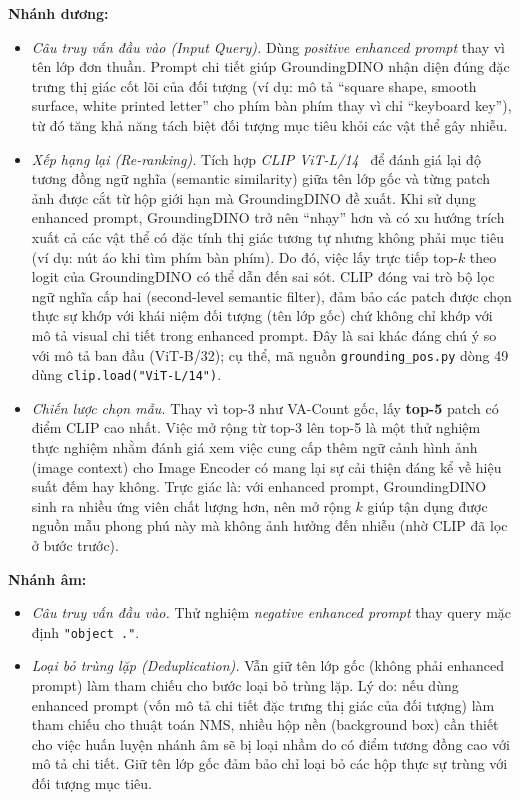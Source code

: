 \documentclass[a4paper,12pt]{report}
\numberwithin{figure}{chapter}
\numberwithin{table}{chapter}
\begin{document}
\textbf{Nhánh dương:}
\begin{itemize}
    \item \textit{Câu truy vấn đầu vào (Input Query).} Dùng \emph{positive enhanced prompt} thay vì tên lớp đơn thuần. Prompt chi tiết giúp GroundingDINO nhận diện đúng đặc trưng thị giác cốt lõi của đối tượng (ví dụ: mô tả ``square shape, smooth surface, white printed letter'' cho phím bàn phím thay vì chỉ ``keyboard key''), từ đó tăng khả năng tách biệt đối tượng mục tiêu khỏi các vật thể gây nhiễu.
    \item \textit{Xếp hạng lại (Re-ranking).} Tích hợp \emph{CLIP ViT-L/14}~\cite{clip} để đánh giá lại độ tương đồng ngữ nghĩa (semantic similarity) giữa tên lớp gốc và từng patch ảnh được cắt từ hộp giới hạn mà GroundingDINO đề xuất. Khi sử dụng enhanced prompt, GroundingDINO trở nên ``nhạy'' hơn và có xu hướng trích xuất cả các vật thể có đặc tính thị giác tương tự nhưng không phải mục tiêu (ví dụ: nút áo khi tìm phím bàn phím). Do đó, việc lấy trực tiếp top-$k$ theo logit của GroundingDINO có thể dẫn đến sai sót. CLIP đóng vai trò bộ lọc ngữ nghĩa cấp hai (second-level semantic filter), đảm bảo các patch được chọn thực sự khớp với khái niệm đối tượng (tên lớp gốc) chứ không chỉ khớp với mô tả visual chi tiết trong enhanced prompt. Đây là sai khác đáng chú ý so với mô tả ban đầu (ViT-B/32); cụ thể, mã nguồn \texttt{grounding\_pos.py} dòng 49 dùng \texttt{clip.load("ViT-L/14")}.
    \item \textit{Chiến lược chọn mẫu.} Thay vì top-3 như VA-Count gốc, lấy \textbf{top-5} patch có điểm CLIP cao nhất. Việc mở rộng từ top-3 lên top-5 là một thử nghiệm thực nghiệm nhằm đánh giá xem việc cung cấp thêm ngữ cảnh hình ảnh (image context) cho Image Encoder có mang lại sự cải thiện đáng kể về hiệu suất đếm hay không. Trực giác là: với enhanced prompt, GroundingDINO sinh ra nhiều ứng viên chất lượng hơn, nên mở rộng $k$ giúp tận dụng được nguồn mẫu phong phú này mà không ảnh hưởng đến nhiễu (nhờ CLIP đã lọc ở bước trước).
\end{itemize}

\textbf{Nhánh âm:}
\begin{itemize}
    \item \textit{Câu truy vấn đầu vào.} Thử nghiệm \emph{negative enhanced prompt} thay query mặc định \texttt{"object ."}.
    \item \textit{Loại bỏ trùng lặp (Deduplication).} Vẫn giữ tên lớp gốc (không phải enhanced prompt) làm tham chiếu cho bước loại bỏ trùng lặp. Lý do: nếu dùng enhanced prompt (vốn mô tả chi tiết đặc trưng thị giác của đối tượng) làm tham chiếu cho thuật toán NMS, nhiều hộp nền (background box) cần thiết cho việc huấn luyện nhánh âm sẽ bị loại nhầm do có điểm tương đồng cao với mô tả chi tiết. Giữ tên lớp gốc đảm bảo chỉ loại bỏ các hộp thực sự trùng với đối tượng mục tiêu.
\end{itemize}
\end{document}
